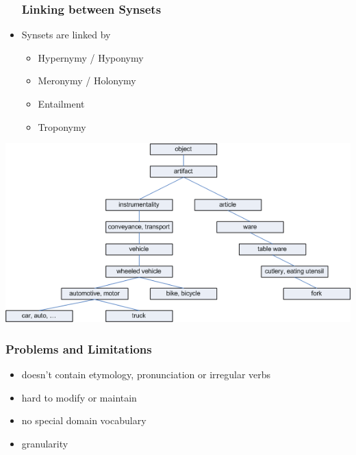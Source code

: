 \begin{frame}
\begin{minipage}{0.40\textwidth}
\begin{itemize}
\frametitle{Linking between Synsets}
\item Synsets are linked by
\begin{itemize}
\item Hypernymy / Hyponymy
\item Meronymy / Holonymy 
\item Entailment 
\item Troponymy
\end{itemize}
\end{itemize}
\end{minipage}
\begin{minipage}{0.5\textwidth}
\includegraphics[scale=0.33]{img/wordnet_hyponym.png}
\end{minipage}
\end{frame}

\begin{frame}
\frametitle{Problems and Limitations}
\begin{itemize}
\item doesn't contain etymology, pronunciation or irregular verbs
\item hard to modify or maintain
\item no special domain vocabulary
\item granularity
\end{itemize}
\end{frame}


